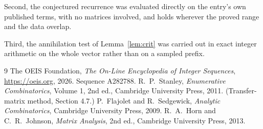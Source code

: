 \documentclass[11pt,a4paper]{article}
\theoremstyle{plain}
\theoremstyle{definition}
\begin{document}
Second, the conjectured recurrence was evaluated directly on the entry's own published terms,
with no matrices involved, and holds wherever the proved range and the data overlap.

Third, the annihilation test of Lemma~\ref{lem:crit} was carried out in exact integer
arithmetic on the whole vector rather than on a sampled prefix.

\begin{thebibliography}{9}
 The OEIS Foundation, \emph{The On-Line Encyclopedia of Integer
Sequences}, \url{https://oeis.org}, 2026. Sequence A282788.
 R.~P.~Stanley, \emph{Enumerative Combinatorics}, Volume 1, 2nd ed.,
Cambridge University Press, 2011. (Transfer-matrix method, Section 4.7.)
 P.~Flajolet and R.~Sedgewick, \emph{Analytic Combinatorics}, Cambridge
University Press, 2009.
 R.~A.~Horn and C.~R.~Johnson, \emph{Matrix Analysis}, 2nd ed., Cambridge
University Press, 2013.
\end{thebibliography}
\end{document}
